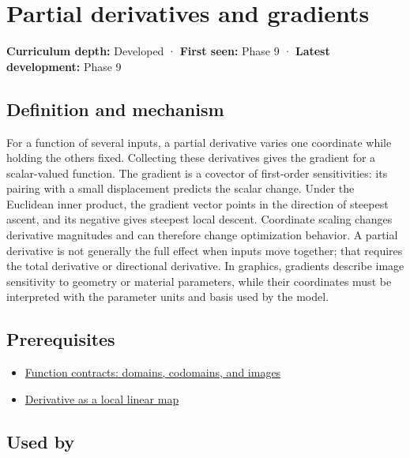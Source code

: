 \hypertarget{appendix-677b59746ae0}{}\label{referencestart:appendix-677b59746ae0}
\section{Partial derivatives and gradients}\label{appendix-677b59746ae0-partial-derivatives-and-gradients}

\textbf{Curriculum depth:} Developed · \textbf{First seen:} Phase 9 · \textbf{Latest development:} Phase 9

\subsection{Definition and mechanism}\label{appendix-677b59746ae0-definition-and-mechanism}

For a function of several inputs, a partial derivative varies one coordinate while holding the others fixed. Collecting these derivatives gives the gradient for a scalar-valued function. The gradient is a covector of first-order sensitivities: its pairing with a small displacement predicts the scalar change. Under the Euclidean inner product, the gradient vector points in the direction of steepest ascent, and its negative gives steepest local descent. Coordinate scaling changes derivative magnitudes and can therefore change optimization behavior. A partial derivative is not generally the full effect when inputs move together; that requires the total derivative or directional derivative. In graphics, gradients describe image sensitivity to geometry or material parameters, while their coordinates must be interpreted with the parameter units and basis used by the model.

\subsection{Prerequisites}\label{appendix-677b59746ae0-prerequisites}

\begin{itemize}
\tightlist
\item
  \hyperref[appendix-a59658325cd6]{Function contracts: domains, codomains, and images}
\item
  \hyperref[appendix-7bc181935c42]{Derivative as a local linear map}
\end{itemize}

\subsection{Used by}\label{appendix-677b59746ae0-used-by}

